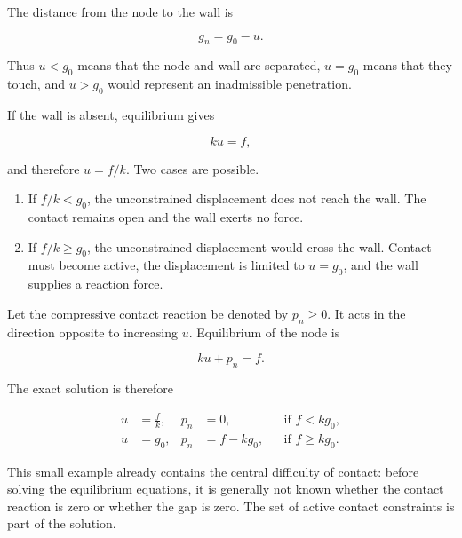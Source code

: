 The distance from the node to the wall is

\begin{equation}\label{contact-1d-gap}
    g_n = g_0 - u.
\end{equation}

Thus $ u < g_0 $ means that the node and wall are separated, $ u = g_0 $
means that they touch, and $ u > g_0 $ would represent an inadmissible
penetration.

If the wall is absent, equilibrium gives

\begin{equation}
    k u = f,
\end{equation}

and therefore $ u = f/k $. Two cases are possible.

\begin{enumerate}
    \item If $ f/k < g_0 $, the unconstrained displacement does not reach the
        wall. The contact remains open and the wall exerts no force.

    \item If $ f/k \geq g_0 $, the unconstrained displacement would cross the
        wall. Contact must become active, the displacement is limited to
        $ u = g_0 $, and the wall supplies a reaction force.
\end{enumerate}

Let the compressive contact reaction be denoted by $ p_n \geq 0 $. It acts in
the direction opposite to increasing $ u $. Equilibrium of the node is

\begin{equation}\label{contact-1d-equilibrium}
    k u + p_n = f.
\end{equation}

The exact solution is therefore

\begin{equation}\label{contact-1d-exact-solution}
    \begin{aligned}
        u &= \frac{f}{k},       & p_n &= 0,
        && \text{if } f < k g_0, \\
        u &= g_0,               & p_n &= f-k g_0,
        && \text{if } f \geq k g_0.
    \end{aligned}
\end{equation}

This small example already contains the central difficulty of contact: before
solving the equilibrium equations, it is generally not known whether the
contact reaction is zero or whether the gap is zero. The set of active contact
constraints is part of the solution.


